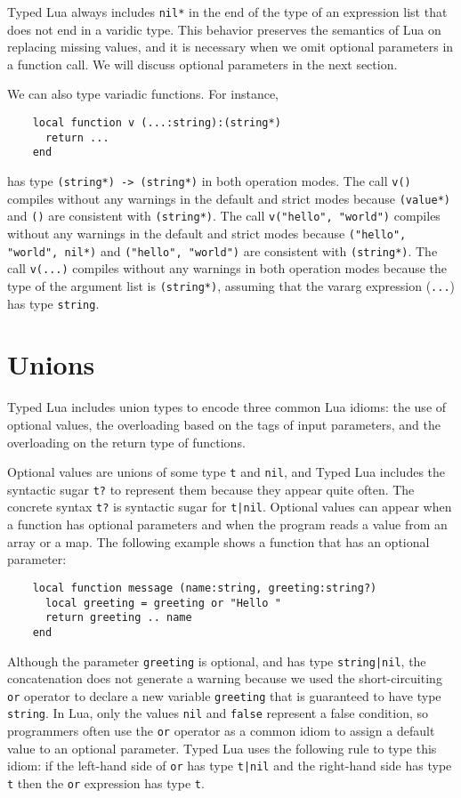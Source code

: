 Typed Lua always includes \texttt{nil*} in the end of the type
of an expression list that does not end in a varidic type.
This behavior preserves the semantics of Lua on replacing missing values,
and it is necessary when we omit optional parameters in a function call.
We will discuss optional parameters in the next section.

We can also type variadic functions.
For instance,
\begin{verbatim}
    local function v (...:string):(string*)
      return ...
    end
\end{verbatim}
has type \texttt{(string*) -> (string*)} in both operation modes.
The call \texttt{v()} compiles without any warnings in the default and
strict modes because \texttt{(value*)} and \texttt{()} are consistent
with \texttt{(string*)}.
The call \texttt{v("hello", "world")} compiles without any warnings
in the default and strict modes because \texttt{("hello", "world", nil*)}
and \texttt{("hello", "world")} are consistent with \texttt{(string*)}.
The call \texttt{v(...)} compiles without any warnings in both
operation modes because the type of the argument list is \texttt{(string*)},
assuming that the vararg expression (\texttt{...}) has type \texttt{string}.

\section{Unions}
\label{sec:unions}

Typed Lua includes union types to encode three common Lua idioms:
the use of optional values, the overloading based on the tags of
input parameters, and the overloading on the return type of functions.

Optional values are unions of some type \texttt{t} and \texttt{nil},
and Typed Lua includes the syntactic sugar \texttt{t?} to represent
them because they appear quite often.
The concrete syntax \texttt{t?} is syntactic sugar for \texttt{t|nil}.
Optional values can appear when a function has optional parameters
and when the program reads a value from an array or a map.
The following example shows a function that has an optional parameter:
\begin{verbatim}
    local function message (name:string, greeting:string?)
      local greeting = greeting or "Hello "
      return greeting .. name
    end
\end{verbatim}

Although the parameter \texttt{greeting} is optional, and has type
\texttt{string|nil}, the concatenation does not generate a warning
because we used the short-circuiting \texttt{or} operator to declare a
new variable \texttt{greeting} that is guaranteed to have type \texttt{string}. 
In Lua, only the values \texttt{nil} and \texttt{false} represent a
false condition, so programmers often use the \texttt{or} operator as a
common idiom to assign a default value to an optional parameter. 
Typed Lua uses the following rule to type this idiom: 
if the left-hand side of \texttt{or} has type \texttt{t|nil} and
the right-hand side has type \texttt{t} then the \texttt{or} expression has
type \texttt{t}.

